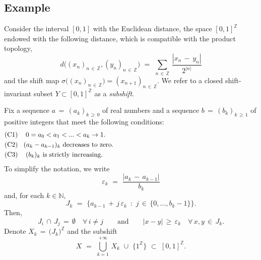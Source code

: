 \documentclass[11pt,a4paper,reqno]{amsart}
\theoremstyle{plain}
\theoremstyle{definition}
\newcommand{\field}[1]{\mathbb{#1}}
\newcommand{\ZZ}{\field{Z}}
\newcommand{\NN}{\field{N}}
\newcommand{\ep} {\varepsilon}
\newcommand{\si} {\sigma}       \newcommand{\Si}{\Sigma}
\newcommand{\mdim}{\mathrm{mdim}}
\begin{document}
\subsection{Example}\label{se:exampleB}

Consider the interval $[0,1]$ with the Euclidean distance, the space $[0,1]^\ZZ$ endowed with the following distance, which is compatible with the product topology,
$$d\big((x_n)_{n\,\in\,\ZZ},(y_n)_{n\,\in\,\ZZ}\big)\,\,=\,\,\sum_{n\,\in\,\ZZ}\,\frac{|x_n\,-\,y_n|}{2^{|n|}}$$ and 
the shift map $\si\big((x_n)_{n\,\in\,\ZZ}\big)=(x_{n+1})_{n\,\in\,\ZZ}.$
We refer to a closed shift-invariant subset $Y\subset [0,1]^\ZZ$ as a \emph{subshift}.

\medskip

Fix a sequence $a\,=\,(a_k)_{k\,\geq\,0}$ of real numbers and a sequence $b\,=\,(b_k)_{k\,\geq\,1}$ of positive integers that meet the following conditions:
\begin{equation*}\label{conditionshorseshoe}
    \begin{split}
        & \text{(C1) }\hspace{.3cm} 0=a_0<a_1<...<a_k\to1.\hspace{8cm} \\ & \text{(C2)}\hspace{.3cm} (a_{k}-a_{k-1})_k \text{ decreases to zero.}\\ & \text{(C3) }\hspace{.3cm} (b_k)_k \text{ is strictly increasing.}
    \end{split}
\end{equation*} 
To simplify the notation, we write 
\begin{equation}\label{ep_k}
    \ep_k \,\,=\,\, \frac{|a_k\,-\,a_{k-1}|}{b_k}
\end{equation}
and, for each $k\in\NN,$
$$J_k\,\,=\,\,\Big\{a_{k-1}\,+\,j\,\ep_k\,\,\,\colon\,\, j\,\in\,\big\{0,...,b_{k}-1\big\}\Big\}.$$ Then, $$J_i\,\cap\,J_j\,=\,\emptyset\,\,\,\,\,\,\forall\, i\ne j\qquad \text{and}\qquad |x-y|\,\geq\,\ep_k\,\,\,\,\,\,\forall\,x,y\,\in\,J_k.$$ Denote $X_k\,=\,\big(J_k\big)^\ZZ$ and the subshift
\begin{equation*}
X\,\,=\,\,\bigcup_{k=1}^{+\infty}\,X_k\,\,\cup\,\,\big\{1^\ZZ\big\}\,\,\subset\,\,[0,1]^\ZZ.
\end{equation*}
\end{document}
